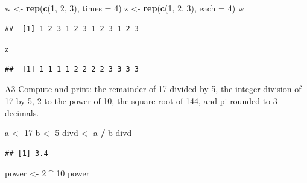 \documentclass[
]{article}
\newenvironment{Shaded}{\begin{snugshade}}{\end{snugshade}}
\newcommand{\AttributeTok}[1]{\textcolor[rgb]{0.13,0.29,0.53}{#1}}
\newcommand{\DecValTok}[1]{\textcolor[rgb]{0.00,0.00,0.81}{#1}}
\newcommand{\FunctionTok}[1]{\textcolor[rgb]{0.13,0.29,0.53}{\textbf{#1}}}
\newcommand{\NormalTok}[1]{#1}
\newcommand{\OtherTok}[1]{\textcolor[rgb]{0.56,0.35,0.01}{#1}}
\newcommand{\SpecialCharTok}[1]{\textcolor[rgb]{0.81,0.36,0.00}{\textbf{#1}}}
\begin{document}
\begin{Shaded}
\begin{Highlighting}[]
\NormalTok{w }\OtherTok{\textless{}{-}} \FunctionTok{rep}\NormalTok{(}\FunctionTok{c}\NormalTok{(}\DecValTok{1}\NormalTok{, }\DecValTok{2}\NormalTok{, }\DecValTok{3}\NormalTok{), }\AttributeTok{times =} \DecValTok{4}\NormalTok{)}
\NormalTok{z }\OtherTok{\textless{}{-}} \FunctionTok{rep}\NormalTok{(}\FunctionTok{c}\NormalTok{(}\DecValTok{1}\NormalTok{, }\DecValTok{2}\NormalTok{, }\DecValTok{3}\NormalTok{), }\AttributeTok{each =} \DecValTok{4}\NormalTok{)}
\NormalTok{w}
\end{Highlighting}
\end{Shaded}

\begin{verbatim}
##  [1] 1 2 3 1 2 3 1 2 3 1 2 3
\end{verbatim}

\begin{Shaded}
\begin{Highlighting}[]
\NormalTok{z}
\end{Highlighting}
\end{Shaded}

\begin{verbatim}
##  [1] 1 1 1 1 2 2 2 2 3 3 3 3
\end{verbatim}

A3 Compute and print: the remainder of 17 divided by 5, the integer
division of 17 by 5, 2 to the power of 10, the square root of 144, and
pi rounded to 3 decimals.

\begin{Shaded}
\begin{Highlighting}[]
\NormalTok{a }\OtherTok{\textless{}{-}} \DecValTok{17}
\NormalTok{b }\OtherTok{\textless{}{-}} \DecValTok{5}
\NormalTok{divd }\OtherTok{\textless{}{-}}\NormalTok{ a }\SpecialCharTok{/}\NormalTok{ b}
\NormalTok{divd}
\end{Highlighting}
\end{Shaded}

\begin{verbatim}
## [1] 3.4
\end{verbatim}

\begin{Shaded}
\begin{Highlighting}[]
\NormalTok{power }\OtherTok{\textless{}{-}} \DecValTok{2} \SpecialCharTok{\^{}} \DecValTok{10}
\NormalTok{power}
\end{Highlighting}
\end{Shaded}
\end{document}
